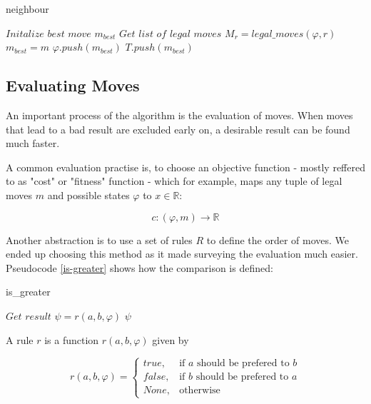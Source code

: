 \documentclass[a4paper,12pt,parskip]{article}
\begin{document}
\begin{algorithm}
\caption{neighbour}\label{alg:neighbour}
\begin{algorithmic}
        \State $\textit{Initalize best move } m_{best}$
        \State $\textit{Get list of legal moves } M_r = legal\_moves(\varphi, r)$
                \State $m_{best} = m$
            \EndIf
        \EndFor
            \State $\varphi.push(m_{best})$
            \State $T.push(m_{best})$
        \EndIf
    \EndFor
    \Return {$\varphi$}
\end{algorithmic}
\end{algorithm}

\subsection{Evaluating Moves}

An important process of the algorithm is the evaluation of moves. When moves that 
lead to a bad result are excluded early on, a desirable result can be found much 
faster. 

A common evaluation practise is, to choose an objective function - mostly reffered 
to as "cost" or "fitness" function - which for example, maps any tuple of legal 
moves $m$ and possible states $\varphi$ to $x \in \mathbb{R}$:

$$
c : (\varphi, m) \rightarrow \mathbb{R}
$$
 
Another abstraction is to use a set of rules $R$ to define the order of moves. 
We ended up choosing this method as it made surveying the evaluation much easier. 
Pseudocode \ref{is-greater} shows how the comparison is defined:

\begin{algorithm}
\caption{is\_greater}\label{is-greater}
\begin{algorithmic}
        \State $\textit{Get result } \psi = r(a, b, \varphi)$
            \Return $\psi$
        \EndIf
    \EndFor
\end{algorithmic}
\end{algorithm}

A rule $r$ is a function $r(a, b, \varphi)$ given by

\[
    r(a, b, \varphi) = 
    \begin{cases}
        true,& \text{if } a \text{ should be prefered to } b\\
        false,& \text{if } b \text{ should be prefered to } a\\
        None,& \text{otherwise}
    \end{cases}
\]
\end{document}
